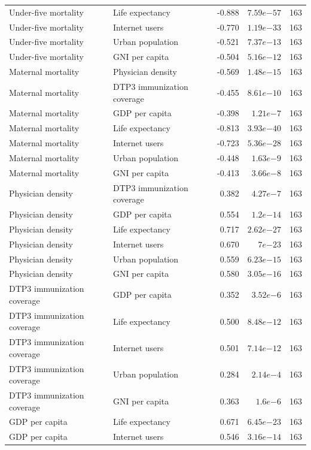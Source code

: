 \documentclass[runningheads]{llncs}
\begin{document}
{\begin{longtable}{p{}p{}r@{\hspace{0.8em}}r@{\hspace{0.8em}}r}
Under-five mortality & Life expectancy & -0.888 & $7.59e{-57}$ & 163 \\
Under-five mortality & Internet users & -0.770 & $1.19e{-33}$ & 163 \\
Under-five mortality & Urban population & -0.521 & $7.37e{-13}$ & 163 \\
Under-five mortality & GNI per capita & -0.504 & $5.16e{-12}$ & 163 \\
Maternal mortality & Physician density & -0.569 & $1.48e{-15}$ & 163 \\
Maternal mortality & DTP3 immunization coverage & -0.455 & $8.61e{-10}$ & 163 \\
Maternal mortality & GDP per capita & -0.398 & $1.21e{-7}$ & 163 \\
Maternal mortality & Life expectancy & -0.813 & $3.93e{-40}$ & 163 \\
Maternal mortality & Internet users & -0.723 & $5.36e{-28}$ & 163 \\
Maternal mortality & Urban population & -0.448 & $1.63e{-9}$ & 163 \\
Maternal mortality & GNI per capita & -0.413 & $3.66e{-8}$ & 163 \\
Physician density & DTP3 immunization coverage & 0.382 & $4.27e{-7}$ & 163 \\
Physician density & GDP per capita & 0.554 & $1.2e{-14}$ & 163 \\
Physician density & Life expectancy & 0.717 & $2.62e{-27}$ & 163 \\
Physician density & Internet users & 0.670 & $7e{-23}$ & 163 \\
Physician density & Urban population & 0.559 & $6.23e{-15}$ & 163 \\
Physician density & GNI per capita & 0.580 & $3.05e{-16}$ & 163 \\
DTP3 immunization coverage & GDP per capita & 0.352 & $3.52e{-6}$ & 163 \\
DTP3 immunization coverage & Life expectancy & 0.500 & $8.48e{-12}$ & 163 \\
DTP3 immunization coverage & Internet users & 0.501 & $7.14e{-12}$ & 163 \\
DTP3 immunization coverage & Urban population & 0.284 & $2.14e{-4}$ & 163 \\
DTP3 immunization coverage & GNI per capita & 0.363 & $1.6e{-6}$ & 163 \\
GDP per capita & Life expectancy & 0.671 & $6.45e{-23}$ & 163 \\
GDP per capita & Internet users & 0.546 & $3.16e{-14}$ & 163 \\

\end{longtable}}
\end{document}
